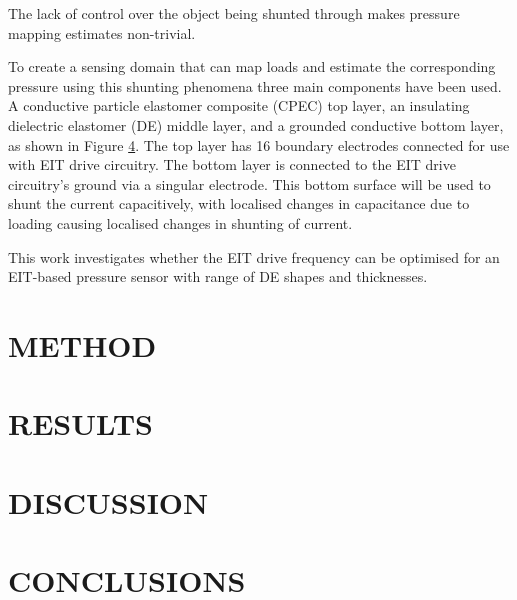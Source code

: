 The lack of control over the object being shunted through makes pressure mapping estimates non-trivial.

To create a sensing domain that can map loads and estimate the corresponding pressure using this shunting phenomena three main components have been used. A conductive particle elastomer composite (CPEC) top layer, an insulating dielectric elastomer (DE) middle layer, and a grounded conductive bottom layer, as shown in Figure \ref{}. The top layer has 16 boundary electrodes connected for use with EIT drive circuitry. The bottom layer is connected to the EIT drive circuitry's ground via a singular electrode. This bottom surface will be used to shunt the current capacitively, with localised changes in capacitance due to loading causing localised changes in shunting of current.


This work investigates whether the EIT drive frequency can be optimised for an EIT-based pressure sensor with range of DE shapes and thicknesses.


\section{METHOD}




\section{RESULTS}




\section{DISCUSSION}




\section{CONCLUSIONS}
